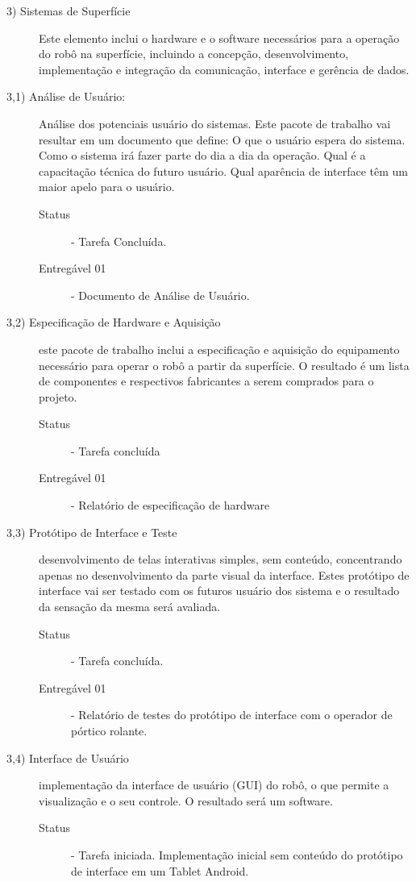 \begin{description}

\vspace{0,5cm}

\item[3) Sistemas de Superfície] Este elemento inclui o hardware e o software necessários para a operação do robô na superfície, incluindo a concepção, desenvolvimento, implementação e integração da comunicação, interface e gerência de dados. 

\item[3,1) Análise de Usuário:] Análise dos potenciais usuário do sistemas. Este pacote de trabalho vai resultar em um documento que define: O que o usuário espera do sistema. Como o sistema irá fazer parte do dia a dia da operação. Qual é a capacitação técnica do futuro usuário. Qual aparência de interface têm um maior apelo para o usuário.

\begin{description}
	\item [Status] - Tarefa Concluída. 
	\item [Entregável 01] - Documento de Análise de Usuário.
\end{description} 

\item[3,2) Especificação de Hardware e Aquisição] este pacote de trabalho inclui a especificação e aquisição do equipamento necessário para operar o robô a partir da superfície. O resultado é um lista de componentes e respectivos fabricantes a serem comprados para o projeto. 

\begin{description}
	\item [Status] - Tarefa concluída
	\item [Entregável 01] - Relatório de especificação de hardware 
\end{description} 


\item[3,3) Protótipo de Interface e Teste] desenvolvimento de telas interativas simples, sem conteúdo, concentrando apenas no desenvolvimento da parte visual da interface. Estes protótipo de interface vai ser testado com os futuros usuário dos sistema e o resultado da sensação da mesma será avaliada.

\begin{description}
	\item [Status] - Tarefa concluída. 
	 \item [Entregável 01] - Relatório de testes do protótipo de interface com o operador de pórtico rolante. 
\end{description} 

\item[3,4) Interface de Usuário] implementação da interface de usuário (GUI) do robô, o que permite a visualização e o seu controle. O resultado será um software. 

\begin{description}
	\item [Status] - Tarefa iniciada. Implementação inicial sem conteúdo do protótipo de interface em um Tablet Android. 
\end{description} 


\end{description}